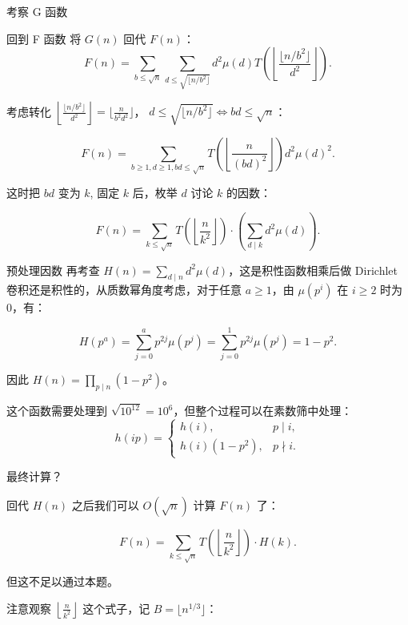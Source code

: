 \documentclass{beamer}
\begin{document}
{\begin{frame}{考察 G 函数}
\end{frame}

\begin{frame}{回到 F 函数}
将 $G(n)$ 回代 $F(n)$：
\[
  F(n) = \sum_{b\le\sqrt n}\sum_{d\le\sqrt{\lfloor n / b^2 \rfloor}}d^2\mu(d)T\left(\left\lfloor\frac {\lfloor n / b^2\rfloor}{d^2}\right\rfloor\right).
\]  

考虑转化 $\left\lfloor\frac {\lfloor n / b^2\rfloor}{d^2}\right\rfloor = \lfloor\frac {n}{b^2d^2}\rfloor$， $d\le\sqrt{\lfloor n / b^2 \rfloor} \Leftrightarrow bd \le \sqrt{n}$：

\[
  F(n) = \sum_{b \ge 1, d \ge 1,bd \le \sqrt{n}} T\left( \left\lfloor\frac {n}{(bd)^2}\right\rfloor \right) d^2\mu(d)^2.
\]

这时把 $bd$ 变为 $k$, 固定 $k$ 后，枚举 $d$ 讨论 $k$ 的因数：

\[
  F(n) = \sum_{k \le \sqrt{n}} T\left( \left\lfloor\frac {n}{k^2}\right\rfloor \right) \cdot \left(\sum_{d \mid k} d^2\mu(d)\right).
\]



\end{frame}


\begin{frame}{预处理因数}
再考查 $H(n) = \sum\limits_{d \mid n} d^2\mu(d)$，这是积性函数相乘后做 Dirichlet 卷积还是积性的，从质数幂角度考虑，对于任意 $a \ge 1$，由 $\mu(p^{i})$ 在 $i \ge 2$ 时为 $0$，有：

\[
  H(p^a) = \sum_{j = 0}^{a} p^{2j} \mu(p^j)  = \sum_{j = 0}^{1} p^{2j} \mu(p^j) = 1 - p^2.
\]

因此 $H(n) = \prod\limits_{p \mid n}(1 - p^2)$。

这个函数需要处理到 $\sqrt{10^{12}} = 10^6$，但整个过程可以在素数筛中处理：
\[
  h(ip) = \begin{cases}
    h(i), &p \mid i,\\
    h(i)(1 - p^2), & p\nmid i.
  \end{cases}
\]

\end{frame}

\begin{frame}{最终计算？}

回代 $H(n)$ 之后我们可以 $O(\sqrt{n})$ 计算 $F(n)$ 了：

\[
  F(n) = \sum_{k \le \sqrt{n}} T\left( \left\lfloor\frac {n}{k^2}\right\rfloor \right) \cdot H(k).
\]

但这不足以通过本题。 

注意观察 $\left\lfloor\frac {n}{k^2}\right\rfloor$ 这个式子，记 $B = \lfloor n^{1/3} \rfloor$：


\end{frame}}
\end{document}
